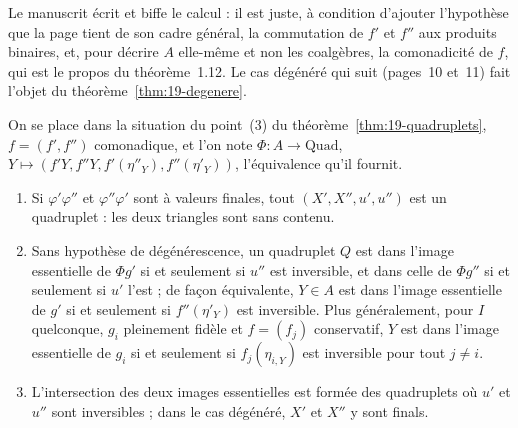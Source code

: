 \begin{remarque}
Le manuscrit écrit  et biffe le calcul : il est juste, à condition d'ajouter l'hypothèse que la page tient de son cadre général, la commutation de $f'$ et $f''$ aux produits binaires, et, pour décrire $A$ elle-même et non les coalgèbres, la comonadicité de $f$, qui est le propos du théorème~1.12. Le cas dégénéré qui suit (pages~10 et~11) fait l'objet du théorème~\ref{thm:19-degenere}.
\end{remarque}

\begin{encadre}
\begin{theoreme}\label{thm:19-degenere}
On se place dans la situation du point~(3) du théorème~\ref{thm:19-quadruplets}, $f = (f', f'')$ comonadique, et l'on note $\Phi : A \to \mathrm{Quad}$, $Y \mapsto (f'Y, f''Y, f'(\eta''_Y), f''(\eta'_Y))$, l'équivalence qu'il fournit.
\begin{enumerate}
\item Si $\varphi'\varphi''$ et $\varphi''\varphi'$ sont à valeurs finales, tout $(X', X'', u', u'')$ est un quadruplet : les deux triangles sont sans contenu.
\item Sans hypothèse de dégénérescence, un quadruplet $Q$ est dans l'image essentielle de $\Phi g'$ si et seulement si $u''$ est inversible, et dans celle de $\Phi g''$ si et seulement si $u'$ l'est ; de façon équivalente, $Y \in A$ est dans l'image essentielle de $g'$ si et seulement si $f''(\eta'_Y)$ est inversible. Plus généralement, pour $I$ quelconque, $g_i$ pleinement fidèle et $f = (f_j)$ conservatif, $Y$ est dans l'image essentielle de $g_i$ si et seulement si $f_j(\eta_{i, Y})$ est inversible pour tout $j \neq i$.
\item L'intersection des deux images essentielles est formée des quadruplets où $u'$ et $u''$ sont inversibles ; dans le cas dégénéré, $X'$ et $X''$ y sont finals.
\end{enumerate}
\end{theoreme}
\end{encadre}

